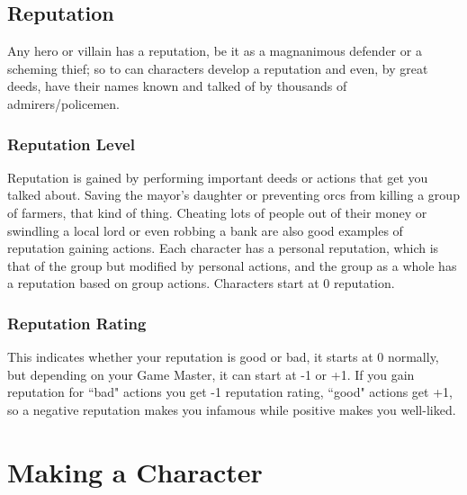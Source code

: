 \documentclass[a4paper,10pt,oneside]{book}
\begin{document}
\section{Reputation}
Any hero or villain has a reputation, be it as a magnanimous defender or a scheming thief; so to can characters develop a reputation and even, by great deeds, have their names known and talked of by thousands of admirers/policemen. 

\subsection{Reputation Level}
Reputation is gained by performing important deeds or actions that get you talked about. Saving the mayor's daughter or preventing orcs from killing a group of farmers, that kind of thing. Cheating lots of people out of their money or swindling a local lord or even robbing a bank are also good examples of reputation gaining actions.
Each character has a personal reputation, which is that of the group but modified by personal actions, and the group as a whole has a reputation based on group actions.
Characters start at 0 reputation.

\subsection{Reputation Rating}
This indicates whether your reputation is good or bad, it starts at 0 normally, but depending on your Game Master, it can start at -1 or +1. If you gain reputation for ``bad" actions you get -1 reputation rating, ``good" actions get +1, so a negative reputation makes you infamous while positive makes you well-liked.





\chapter{Making a Character}
\end{document}
